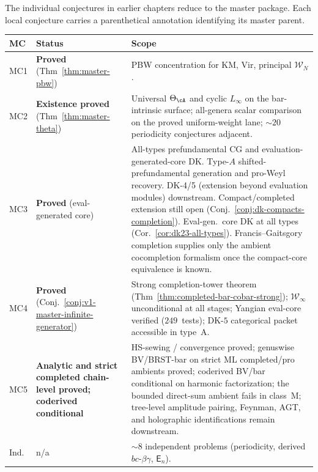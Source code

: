 \begin{remark}\label{rem:conjecture-dependencies}
The individual conjectures in earlier chapters reduce to the
master package. Each local conjecture carries a parenthetical
annotation identifying its master parent.
\begin{center}
\renewcommand{\arraystretch}{1.15}
\begin{tabular}{@{}llp{6.8cm}@{}}
\toprule
\textbf{MC} & \textbf{Status} & \textbf{Scope} \\
\midrule
MC1 & \textbf{Proved} (Thm~\ref{thm:master-pbw})
 & PBW concentration for KM, Vir, principal $\mathcal{W}_N$. \\
MC2 & \textbf{Existence proved} (Thm~\ref{thm:master-theta})
 & Universal $\Theta_{\cA}$ and cyclic $L_\infty$ on the
 bar-intrinsic surface; all-genera scalar comparison on the
 proved uniform-weight lane; ${\sim}20$ periodicity conjectures
 adjacent. \\
MC3 & \textbf{Proved} (eval-generated core)
 & All-types prefundamental CG and evaluation-generated-core DK.
 Type-$A$ shifted-prefundamental generation and pro-Weyl recovery.
 DK-4/5 (extension beyond evaluation modules) downstream.
 Compact/completed extension still open
 (Conj.~\ref{conj:dk-compacts-completion}).
 Eval-gen.\ core DK at all types
 (Cor.~\ref{cor:dk23-all-types}).
 Francis--Gaitsgory completion supplies only the ambient
 cocompletion formalism once the compact-core equivalence is known. \\
MC4 & \textbf{Proved} (Conj.~\ref{conj:v1-master-infinite-generator})
 & Strong completion-tower theorem
 (Thm~\ref{thm:completed-bar-cobar-strong});
 $\mathcal{W}_\infty$ unconditional at all stages;
 Yangian eval-core verified ($249$~tests);
 DK-$5$ categorical packet accessible in type~A. \\
MC5 & \textbf{Analytic and strict completed chain-level proved; coderived conditional}
 & HS-sewing / convergence proved; genuswise BV/BRST-bar on strict ML completed/pro ambients proved; coderived BV/bar conditional on harmonic factorization; the bounded direct-sum ambient fails in class~M; tree-level amplitude pairing, Feynman, AGT, and holographic identifications remain downstream. \\
\midrule
Ind. & n/a & ${\sim}8$ independent problems
 (periodicity, derived $bc$-$\beta\gamma$, $\mathsf{E}_n$). \\
\bottomrule
\end{tabular}
\end{center}
\end{remark}

